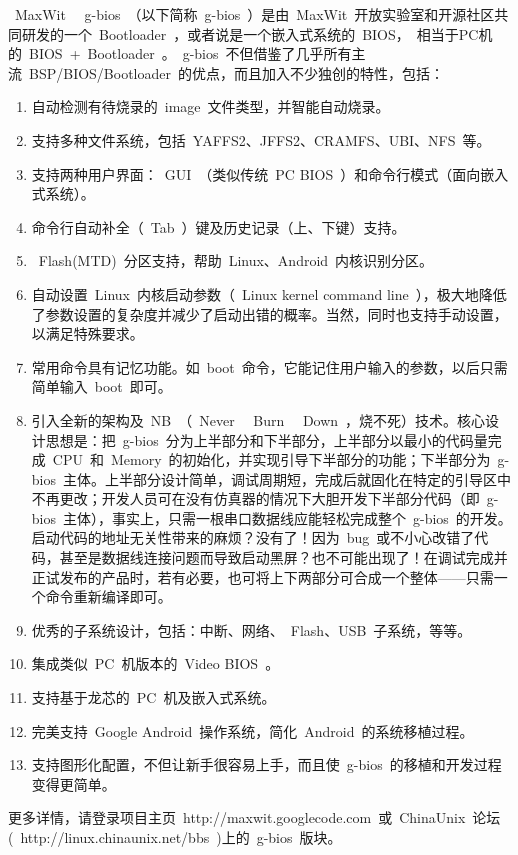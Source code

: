 \documentclass[a4paper,11pt]{book}
\begin{document}
~MaxWit~ ~g-bios~（以下简称~g-bios~）是由~MaxWit~开放实验室和开源社区共同研发的一个~Bootloader~，或者说是一个嵌入式系统的~BIOS，~相当于PC机的~BIOS~+~Bootloader~。~g-bios~不但借鉴了几乎所有主流~BSP/BIOS/Bootloader~的优点，而且加入不少独创的特性，包括：
\begin{enumerate}[1)]\setlength{\itemsep}{-\itemsep}
\item 自动检测有待烧录的~image~文件类型，并智能自动烧录。
\item 支持多种文件系统，包括~YAFFS2、JFFS2、CRAMFS、UBI、NFS~等。
\item 支持两种用户界面：~GUI~（类似传统~PC BIOS~）和命令行模式（面向嵌入式系统）。
\item 命令行自动补全（~Tab~）键及历史记录（上、下键）支持。
\item ~Flash(MTD)~分区支持，帮助~Linux、Android~内核识别分区。
\item 自动设置~Linux~内核启动参数（~Linux kernel command line~），极大地降低了参数设置的复杂度并减少了启动出错的概率。当然，同时也支持手动设置，以满足特殊要求。
\item 常用命令具有记忆功能。如~boot~命令，它能记住用户输入的参数，以后只需简单输入~boot~即可。
\item 引入全新的架构及~NB~（~Never~ ~Burn~ ~Down~，烧不死）技术。核心设计思想是：把~g-bios~分为上半部分和下半部分，上半部分以最小的代码量完成~CPU~和~Memory~的初始化，并实现引导下半部分的功能；下半部分为~g-bios~主体。上半部分设计简单，调试周期短，完成后就固化在特定的引导区中不再更改；开发人员可在没有仿真器的情况下大胆开发下半部分代码（即~g-bios~主体），事实上，只需一根串口数据线应能轻松完成整个~g-bios~的开发。启动代码的地址无关性带来的麻烦？没有了！因为~bug~或不小心改错了代码，甚至是数据线连接问题而导致启动黑屏？也不可能出现了！在调试完成并正试发布的产品时，若有必要，也可将上下两部分可合成一个整体——只需一个命令重新编译即可。
\item 优秀的子系统设计，包括：中断、网络、~Flash、USB~子系统，等等。
\item 集成类似~PC~机版本的~Video BIOS~。
\item 支持基于龙芯的~PC~机及嵌入式系统。
\item 完美支持~Google Android~操作系统，简化~Android~的系统移植过程。
\item 支持图形化配置，不但让新手很容易上手，而且使~g-bios~的移植和开发过程变得更简单。
\end{enumerate}
更多详情，请登录项目主页~http://maxwit.googlecode.com~或~ChinaUnix~论坛(~http://linux.chinaunix.net/bbs~)上的~g-bios~版块。
\end{document}

